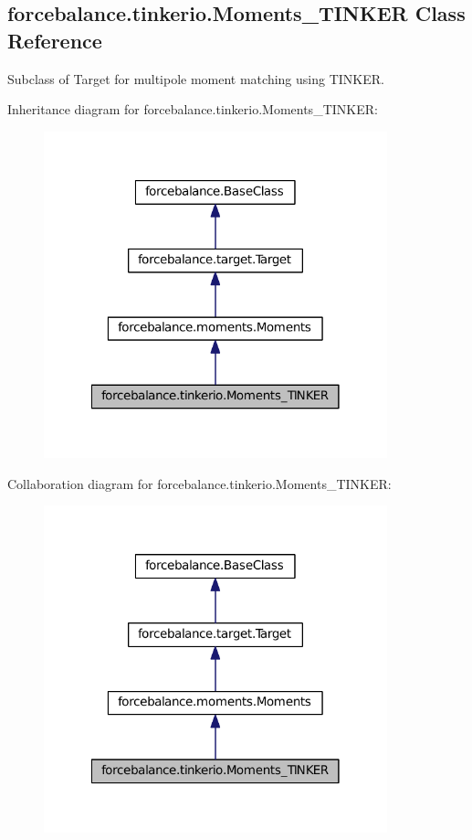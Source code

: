 \hypertarget{classforcebalance_1_1tinkerio_1_1Moments__TINKER}{\subsection{forcebalance.\-tinkerio.\-Moments\-\_\-\-T\-I\-N\-K\-E\-R \-Class \-Reference}
\label{classforcebalance_1_1tinkerio_1_1Moments__TINKER}
}


\-Subclass of \-Target for multipole moment matching using \-T\-I\-N\-K\-E\-R.  




\-Inheritance diagram for forcebalance.\-tinkerio.\-Moments\-\_\-\-T\-I\-N\-K\-E\-R\-:
\nopagebreak
\begin{figure}[H]
\begin{center}
\leavevmode
\includegraphics[width=282pt]{classforcebalance_1_1tinkerio_1_1Moments__TINKER__inherit__graph}
\end{center}
\end{figure}


\-Collaboration diagram for forcebalance.\-tinkerio.\-Moments\-\_\-\-T\-I\-N\-K\-E\-R\-:
\nopagebreak
\begin{figure}[H]
\begin{center}
\leavevmode
\includegraphics[width=282pt]{classforcebalance_1_1tinkerio_1_1Moments__TINKER__coll__graph}
\end{center}
\end{figure}
